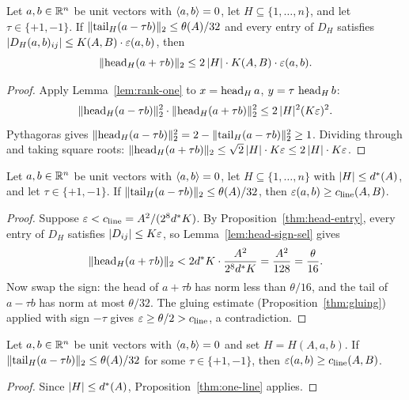 \begin{lemma}\label{lem:head-sign-sel}
Let $a, b \in \mathbb{R}^n$ be unit vectors with $\langle a,b\rangle = 0$, let
$H \subseteq \{1, \dots, n\}$, and let $\tau \in \{+1, -1\}$.
If $\lVert \operatorname{tail}_H(a - \tau b) \rVert_2 \le \theta(A)/32$ and every entry
of $D_H$ satisfies
$\lvert D_H(a,b)_{ij} \rvert \le K(A,B) \cdot \varepsilon(a,b)$,
then
\[
\lVert \operatorname{head}_H(a + \tau b) \rVert_2
\le 2\,\lvert H \rvert \cdot K(A,B) \cdot \varepsilon(a,b).
\]
\end{lemma}

\begin{proof}
Apply Lemma~\ref{lem:rank-one} to
$x = \operatorname{head}_H a$, $y = \tau\,\operatorname{head}_H b$:
\[
\lVert \operatorname{head}_H(a - \tau b) \rVert_2^2
\cdot \lVert \operatorname{head}_H(a + \tau b) \rVert_2^2
\le 2\,\lvert H \rvert^2 (K\varepsilon)^2.
\]
Pythagoras gives
$\lVert \operatorname{head}_H(a - \tau b) \rVert_2^2
= 2 - \lVert \operatorname{tail}_H(a - \tau b) \rVert_2^2 \ge 1$.
Dividing through and taking square roots:
$\lVert \operatorname{head}_H(a + \tau b) \rVert_2
\le \sqrt{2}\,\lvert H \rvert \cdot K\varepsilon
\le 2\,\lvert H \rvert \cdot K\varepsilon$.
\end{proof}

\begin{proposition}\label{thm:one-line}
Let $a, b \in \mathbb{R}^n$ be unit vectors with $\langle a,b\rangle = 0$, let
$H \subseteq \{1, \dots, n\}$ with $\lvert H \rvert \le d^*(A)$, and let
$\tau \in \{+1, -1\}$. If
$\lVert \operatorname{tail}_H(a - \tau b) \rVert_2 \le \theta(A)/32$,
then $\varepsilon(a,b) \ge c_{\mathrm{line}}(A,B)$.
\end{proposition}

\begin{proof}
Suppose $\varepsilon < c_{\mathrm{line}} = A^2/(2^8 d^* K)$. By
Proposition~\ref{thm:head-entry}, every entry of $D_H$ satisfies
$\lvert D_{ij} \rvert \le K\varepsilon$, so Lemma~\ref{lem:head-sign-sel} gives
\[
\lVert \operatorname{head}_H(a + \tau b) \rVert_2
< 2 d^* K \cdot \frac{A^2}{2^8 d^* K}
= \frac{A^2}{128} = \frac{\theta}{16}.
\]
Now swap the sign: the head of $a + \tau b$ has norm less than
$\theta/16$, and the tail of $a - \tau b$ has norm at most $\theta/32$.
The gluing estimate (Proposition~\ref{thm:gluing}) applied with sign
$-\tau$ gives $\varepsilon \ge \theta/2 > c_{\mathrm{line}}$, a contradiction.
\end{proof}

\begin{corollary}\label{cor:headset-one-line}
Let $a, b \in \mathbb{R}^n$ be unit vectors with $\langle a,b\rangle = 0$ and set
$H = H(A,a,b)$. If
$\lVert \operatorname{tail}_H(a - \tau b) \rVert_2 \le \theta(A)/32$
for some $\tau \in \{+1, -1\}$, then
$\varepsilon(a,b) \ge c_{\mathrm{line}}(A,B)$.
\end{corollary}

\begin{proof}
Since $\lvert H \rvert \le d^*(A)$, Proposition~\ref{thm:one-line} applies.
\end{proof}
